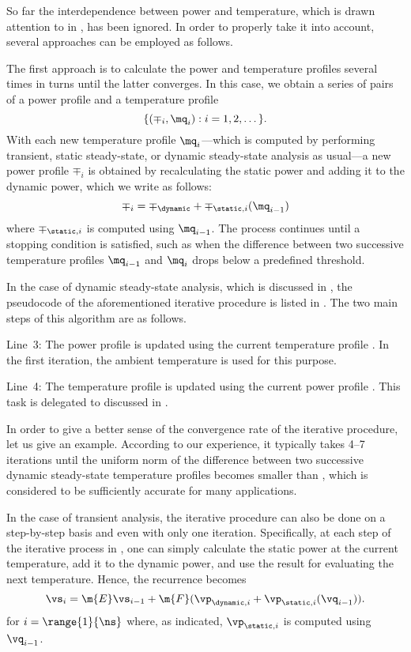 So far the interdependence between power and temperature, which is drawn
attention to in , has been ignored. In order to properly take
it into account, several approaches can be employed as follows.

The first approach is to calculate the power and temperature profiles several
times in turns until the latter converges. In this case, we obtain a series of
pairs of a power profile and a temperature profile
\[
  \{ (\mp_i, \mq_i): i = 1, 2, \dots \}.
\]
With each new temperature profile $\mq_i$---which is computed by performing
transient, static steady-state, or dynamic steady-state analysis as usual---a
new power profile $\mp_i$ is obtained by recalculating the static power and
adding it to the dynamic power, which we write as follows:
\[
  \mp_i = \mp_\dynamic + \mp_{\static, i}(\mq_{i - 1})
\]
where $\mp_{\static, i}$ is computed using $\mq_{i - 1}$. The process continues
until a stopping condition is satisfied, such as when the difference between two
successive temperature profiles $\mq_{i - 1}$ and $\mq_i$ drops below a
predefined threshold.

In the case of dynamic steady-state analysis, which is discussed in
, the pseudocode of the aforementioned iterative
procedure is listed in . The two
main steps of this algorithm are as follows.

Line~3: The power profile \mp is updated using the current temperature profile
\mq. In the first iteration, the ambient temperature is used for this purpose.

Line~4: The temperature profile \mq is updated using the current power profile
\mp. This task is delegated to  discussed in
.

In order to give a better sense of the convergence rate of the iterative
procedure, let us give an example. According to our experience, it typically
takes 4--7 iterations until the uniform norm of the difference between two
successive dynamic steady-state temperature profiles becomes smaller than
, which is considered to be sufficiently accurate for many
applications.

In the case of transient analysis, the iterative procedure can also be done on a
step-by-step basis and even with only one iteration. Specifically, at each step
of the iterative process in , one can simply
calculate the static power at the current temperature, add it to the dynamic
power, and use the result for evaluating the next temperature. Hence, the
recurrence becomes
\[
  \vs_i = \m{E} \vs_{i - 1} + \m{F} (\vp_{\dynamic, i} + \vp_{\static, i}(\vq_{i - 1})).
\]
for $i = \range{1}{\ns}$ where, as indicated, $\vp_{\static, i}$ is computed
using $\vq_{i - 1}$.

